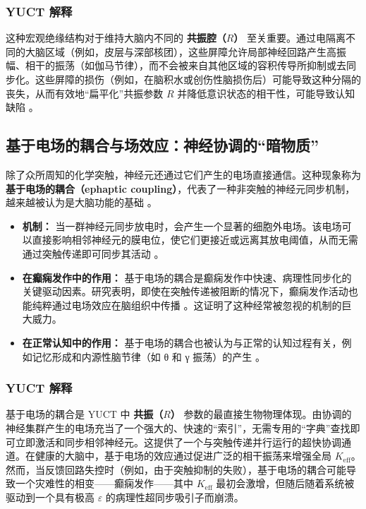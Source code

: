 \documentclass[12pt,a4paper]{article}
\begin{document}
	\subsubsection*{YUCT 解释}
	这种宏观绝缘结构对于维持大脑内不同的 \textbf{共振腔（\(R\)）} 至关重要。通过电隔离不同的大脑区域（例如，皮层与深部核团），这些屏障允许局部神经回路产生高振幅、相干的振荡（如伽马节律），而不会被来自其他区域的容积传导所抑制或去同步化。这些屏障的损伤（例如，在脑积水或创伤性脑损伤后）可能导致这种分隔的丧失，从而有效地“扁平化”共振参数 \(R\) 并降低意识状态的相干性，可能导致认知缺陷 \cite{Krishnamurthy2012}。
	
	\subsection{基于电场的耦合与场效应：神经协调的“暗物质”}
	
	除了众所周知的化学突触，神经元还通过它们产生的电场直接通信。这种现象称为 \textbf{基于电场的耦合（ephaptic coupling）}，代表了一种非突触的神经元同步机制，越来越被认为是大脑功能的基础 \cite{Jefferys1995, Anastassiou2011}。
	
	\begin{itemize}
		\item \textbf{机制：} 当一群神经元同步放电时，会产生一个显著的细胞外电场。该电场可以直接影响相邻神经元的膜电位，使它们更接近或远离其放电阈值，从而无需通过突触传递即可同步其活动 \cite{Frohlich2010}。
		\item \textbf{在癫痫发作中的作用：} 基于电场的耦合是癫痫发作中快速、病理性同步化的关键驱动因素。研究表明，即使在突触传递被阻断的情况下，癫痫发作活动也能纯粹通过电场效应在脑组织中传播 \cite{Zhang2022, Dudek1998}。这证明了这种经常被忽视的机制的巨大威力。
		\item \textbf{在正常认知中的作用：} 基于电场的耦合也被认为与正常的认知过程有关，例如记忆形成和内源性脑节律（如 θ 和 γ 振荡）的产生 \cite{Anastassiou2011}。
	\end{itemize}
	
	\subsubsection*{YUCT 解释}
	基于电场的耦合是 YUCT 中 \textbf{共振（\(R\)）} 参数的最直接生物物理体现。由协调的神经集群产生的电场充当了一个强大的、快速的“索引”，无需专用的“字典”查找即可立即激活和同步相邻神经元。这提供了一个与突触传递并行运行的超快协调通道。在健康的大脑中，基于电场的效应通过促进广泛的相干振荡来增强全局 \(K_{\mathrm{eff}}\)。然而，当反馈回路失控时（例如，由于突触抑制的失败），基于电场的耦合可能导致一个灾难性的相变——癫痫发作——其中 \(K_{\mathrm{eff}}\) 最初会激增，但随后随着系统被驱动到一个具有极高 \(\varepsilon\) 的病理性超同步吸引子而崩溃。
	
\end{document}
